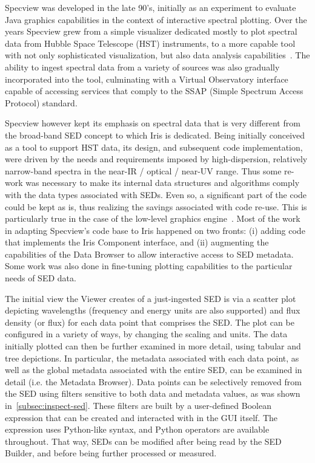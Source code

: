 \documentclass[5p]{elsarticle}
\begin{document}
Specview was developed in the late 90's, initially as an experiment to evaluate Java graphics capabilities in the context of interactive spectral plotting. Over the years Specview grew from a simple visualizer dedicated mostly to plot spectral data from Hubble Space Telescope (HST) instruments, to a more capable tool with not only sophisticated visualization, but also data analysis capabilities~\citep{2002ASPC..281..120B}. The ability to ingest spectral data from a variety of sources was also gradually incorporated into the tool, culminating with a Virtual Observatory interface capable of accessing services that comply to the SSAP (Simple Spectrum Access Protocol) standard.

Specview however kept its emphasis on spectral data that is very different from the broad-band SED concept to which Iris is dedicated. Being initially conceived as a tool to support HST data, its design, and subsequent code implementation, were driven by the needs and requirements imposed by high-dispersion, relatively narrow-band spectra in the near-IR / optical / near-UV range. Thus some re-work was necessary to make its internal data structures and algorithms comply with the data types associated with SEDs. Even so, a significant part of the code could be kept as is, thus realizing the savings associated with code re-use. This is particularly true in the case of the low-level graphics engine~\citep{2000ASPC..216...79B}. Most of the work in adapting Specview's code base to Iris happened on two fronts: (i) adding code that implements the Iris Component interface, and (ii) augmenting the capabilities of the Data Browser to allow interactive access to SED metadata. Some work was also done in fine-tuning plotting capabilities to the particular needs of SED data.

The initial view the Viewer creates of a just-ingested SED is via a scatter plot depicting wavelengths (frequency and energy units are also supported) and flux density (or flux) for each data point that comprises the SED. The plot can be configured in a variety of ways, by changing the scaling and units. The data initially plotted can then be further examined in more detail, using tabular and tree depictions. In particular, the metadata associated with each data point, as well as the global metadata associated with the entire SED, can be examined in detail (i.e. the Metadata Browser). Data points can be selectively removed from the SED using filters sensitive to both data and metadata values, as was shown in~\ref{subsec:inspect-sed}. These filters are built by a user-defined Boolean expression that can be created and interacted with in the GUI itself. The expression uses Python-like syntax, and Python operators are available throughout. That way, SEDs can be modified after being read by the SED Builder, and before being further processed or measured.
\end{document}
